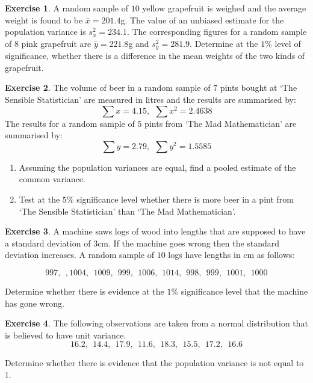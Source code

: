 \documentclass[
]{book}
\theoremstyle{definition}
\theoremstyle{definition}
\theoremstyle{definition}
\newtheorem{exercise}{Exercise}[chapter]
\theoremstyle{definition}
\theoremstyle{remark}
\begin{document}
\begin{exercise}
A random sample of \(10\) yellow grapefruit is weighed and the average weight is found to be \(\bar{x}=201.4\)g. The value of an unbiased estimate for the population variance is \(s^2_x=234.1\). The corresponding figures for a random sample of \(8\) pink grapefruit are \(\bar{y}=221.8\)g and \(s^2_y=281.9\). Determine at the \(1\%\) level of significance, whether there is a difference in the mean weights of the two kinds of grapefruit.
\end{exercise}

\begin{exercise}

The volume of beer in a random sample of \(7\) pints bought at `The Sensible Statistician' are measured in litres and the results are summarised by:
\[\sum x = 4.15, \ \ \sum x^2 = 2.4638\]
The results for a random sample of \(5\) pints from `The Mad Mathematician' are summarised by:
\[\sum y = 2.79 , \ \ \sum y^2 = 1.5585\]

\begin{enumerate}
\def\labelenumi{(\alph{enumi})}
\item
  Assuming the population variances are equal, find a pooled estimate of the common variance.
\item
  Test at the \(5\%\) significance level whether there is more beer in a pint from `The Sensible Statistician' than `The Mad Mathematician'.
\end{enumerate}

\end{exercise}

\begin{exercise}
A machine saws logs of wood into lengths that are supposed to have a standard deviation of \(3\)cm. If the machine goes wrong then the standard deviation increases. A random sample of \(10\) logs have lengths in cm as follows:

\[997, \ \ , 1004, \ \ 1009, \ \ 999, \ \ 1006, \ \, 1014, \ \ 998, \ \ 999, \ \ 1001, \ \ 1000 \]

Determine whether there is evidence at the \(1\%\) significance level that the machine has gone wrong.
\end{exercise}

\begin{exercise}
The following observations are taken from a normal distribution that is believed to have unit variance.
\[16.2, \ \ 14.4, \ \ 17.9, \ \ 11.6, \ \ 18.3, \ \ 15.5, \ \ 17.2, \ \ 16.6\]

Determine whether there is evidence that the population variance is not equal to 1.
\end{exercise}
\end{document}
